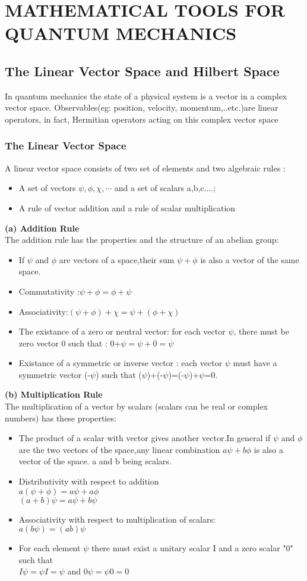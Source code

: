 \chapter{MATHEMATICAL TOOLS FOR QUANTUM MECHANICS}
\section{The Linear Vector Space and Hilbert Space}
In quantum mechanics the state of a physical system is a vector in a complex vector space. Observables(eg: position, velocity, momentum,..etc.)are linear operators, in fact, Hermitian operators acting on this complex vector space
\subsection{The Linear Vector Space}
A linear vector space consists of two set of elements and two algebraic rules :
\begin{itemize}
	\item A set of vectors $\psi,\phi,\chi, \cdots $ and a set of scalars a,b,c....;
	\item A rule of vector addition and a rule of scalar multiplication
\end{itemize}
\textbf{(a) Addition Rule}\\
The addition rule has the properties and the structure of an abelian group:
\begin{itemize}
	\item If $\psi$ and $\phi$ are vectors of a space,their sum $\psi+\phi$ is also a vector of the same space.
	\item Commutativity :$\psi+\phi=\phi+\psi$
	\item Associativity:$(\psi+\phi)+\chi=\psi+(\phi+\chi)$
	\item The existance of a zero or neutral vector: for each vector $\psi$, there must be zero vector 0 such that : 0+$\psi=\psi+0=\psi$
	\item Existance of a symmetric or inverse vector : each vector $\psi$ must have a symmetric vector (-$\psi$) such that ($\psi$)+(-$\psi$)=(-$\psi$)+$\psi$=0.
\end{itemize}
\textbf{(b) Multiplication Rule}\\
The multiplication of a vector by scalars (scalars can be real or complex numbers) has these properties:
\begin{itemize}
	\item The product of a scalar with vector gives another vector.In general if $\psi$ and $\phi$ are the two vectors of the space,any linear combination $a\psi+b\phi$ is also a vector of the space. a and b being scalars.
	\item Distributivity with respect to addition\\
	$a(\psi+\phi)=a\psi+a\phi$\\
	$(a+b)\psi=a\psi+b\psi$
	\item Associativity with respect to multiplication of scalars:\\
	$a(b\psi)=(ab)\psi$
	\item For each element $\psi$ there must exist a unitary scalar I and a zero scalar "0" such that \\
	$I\psi=\psi I =\psi$ and $0\psi=\psi0=0$
\end{itemize}
